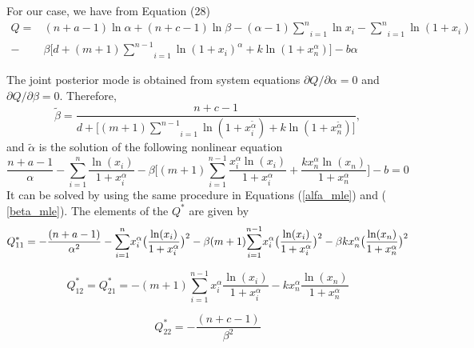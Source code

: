 \documentclass[12pt,a4paper]{article}
\begin{document}
For our case, we have from Equation (28) %
\begin{equation}
\begin{aligned}
Q=&(n+a-1)\ln \alpha +(n+c-1)\ln \beta -(\alpha-1)\underset{i=1}{\overset{n}{\sum }}\ln x_{i}- \underset{i=1}{\overset{n}{\sum }}\ln (1+x_{i}) \\
-&\beta \big[ d+(m+1)\underset{i=1}{\overset{n-1}{\sum }}\ln (1+x_{i})^{\alpha} +k \ln(1+x_{n}^{\alpha}) \big]-b \alpha 
\end{aligned}
\end{equation}%

The joint posterior mode is obtained from system equations $\partial Q/\partial
\alpha =0$ and $\partial Q/\partial \beta =0$. Therefore, 
\begin{equation}
\widetilde{\beta }=\frac{n+c-1}{d+\big [(m+1)\underset{i=1}{\overset{n-1}{\sum }}\ln (1+x_{i}^{\widetilde{\alpha }}) +k \ln(1+x_n^{\widetilde{\alpha }}) \big]},
\end{equation}%
and $\widetilde{\alpha }$ is the solution of the following nonlinear equation%
\begin{equation}
\frac{n+a-1}{\alpha }-\underset{i=1}{\overset{n}{\sum }}\frac{\ln(x_i)}{1+x_i^\alpha}-\beta \big[ (m+1) \underset{i=1}{\overset{n-1}{\sum }} \frac{x_i^\alpha \ln(x_i)}{1+x_i^\alpha} 
+\frac{k x_n^\alpha \ln(x_n)}{1+x_n^\alpha} \big] -b = 0
\end{equation}%
It can be solved by using the same procedure in Equations (\ref{alfa_mle}) and (%
\ref{beta_mle}). The elements of the $Q^{\ast }$ are given by 
\begin{equation}
Q_{11}^{\ast }=-\frac{(n+a-1)}{\alpha ^{2}}-\underset{i=1}{\overset{n}{%
\sum }} x_i^\alpha \big(  \frac{\ln (x_i)}{1+x_i^\alpha }\big)^2-\beta (m+1)\underset{i=1}{\overset{n-1}{\sum }} x_i^\alpha \big( \frac{\ln (x_i)}{1+x_i^\alpha}\big )^2-
\beta k x_n^\alpha \big( \frac{\ln (x_n)}{1+x_n^\alpha} \big)^2
\label{Q11}
\end{equation}%

\begin{equation}
Q_{12}^{\ast }=Q_{21}^ {\ast}=- (m+1)\underset{i=1}{\overset{n-1}{\sum }} x_i^\alpha \frac{\ln (x_i)}{1+x_i^\alpha}- k x_n^\alpha \frac{\ln (x_n)}{1+x_n^\alpha}
\label{Q21}
\end{equation}%


\begin{equation}
Q_{22}^{\ast }=-\frac{(n+c-1)}{\beta ^{2}}
\label{Q22}
\end{equation}%
\end{document}
